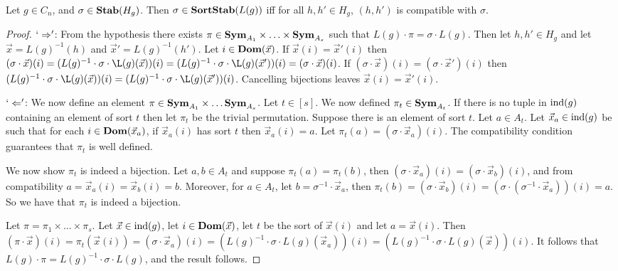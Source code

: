 \documentclass[../paper.tex]{subfiles}
\begin{document}
\begin{lem}
  Let $g \in C_n$, and $\sigma \in \text{\textbf{Stab}}(H_g)$. Then $\sigma \in
  \text{\textbf{SortStab}}(L(g))$ iff for all $h, h' \in H_g$, $(h,h')$ is compatible with
  $\sigma$.
  \label{lem:sortstab-compatible}
\end{lem}
\begin{proof}
  $`\Rightarrow'$: From the hypothesis there exists $\pi \in \text{\textbf{Sym}}_{A_1} \times
  \ldots \times \text{\textbf{Sym}}_{A_s}$ such that $L(g) \cdot \pi = \sigma \cdot L(g)$. Then
  let $h, h' \in H_g$ and let $\vec{x} = L(g)^{-1}(h)$ and $\vec{x}' =
  L(g)^{-1}(h')$. Let $i \in \text{\textbf{Dom}} (\vec{x})$. If $\vec{x}(i) = \vec{x}'(i)$ then
  $(\sigma \cdot \vec{x}) (i) = (L(g)^{-1} \cdot \sigma \cdot \L(g)
  (\vec{x}))(i) = (L(g)^{-1} \cdot \sigma \cdot \L(g) (\vec{x}'))(i) = (\sigma
  \cdot \vec{x}) (i)$. If $(\sigma \cdot \vec{x})(i) = (\sigma \cdot
  \vec{x}')(i)$ then $(L(g)^{-1} \cdot \sigma \cdot \L(g) (\vec{x}))(i) =
  (L(g)^{-1} \cdot \sigma \cdot \L(g) (\vec{x}'))(i)$. Cancelling bijections
  leaves $\vec{x}(i) = \vec{x}'(i)$.
  
  $`\Leftarrow'$: We now define an element $\pi \in \text{\textbf{Sym}}_{A_1} \times \ldots
  \text{\textbf{Sym}}_{A_s}$. Let $t \in [s]$. We now defined $\pi_t \in \text{\textbf{Sym}}_{A_t}$. If there
  is no tuple in $\text{\upshape ind} (g)$ containing an element of sort $t$ then let $\pi_t$
  be the trivial permutation. Suppose there is an element of sort $t$. Let $a
  \in A_t$. Let $\vec{x}_a \in \text{\upshape ind}(g)$ be such that for each $i \in \text{\textbf{Dom}}
  (\vec{x}_a)$, if $\vec{x}_a(i)$ has sort $t$ then $\vec{x}_a(i) = a$. Let
  $\pi_t (a) = (\sigma \cdot \vec{x}_a) (i)$. The compatibility condition
  guarantees that $\pi_t$ is well defined.

  We now show $\pi_t$ is indeed a bijection. Let $a, b \in A_t$ and suppose
  $\pi_t (a) = \pi_t(b)$, then $(\sigma \cdot \vec{x}_a)(i) = (\sigma \cdot
  \vec{x}_b)(i)$, and from compatibility $a = \vec{x}_a(i) = \vec{x}_b(i) = b$.
  Moreover, for $a \in A_t$, let $b = \sigma^{-1} \cdot \vec{x}_a$, then $\pi_t
  (b) = (\sigma \cdot \vec{x}_b)(i) = (\sigma \cdot (\sigma^{-1} \cdot
  \vec{x}_a))(i) = a$. So we have that $\pi_t$ is indeed a bijection.

  Let $\pi = \pi_1 \times \ldots \times \pi_s$. Let $\vec{x} \in \text{\upshape ind}(g)$, let
  $i \in \text{\textbf{Dom}} (\vec{x})$, let $t$ be the sort of $\vec{x}(i)$ and let $a =
  \vec{x}(i)$. Then $(\pi \cdot \vec{x})(i) = \pi_t (\vec{x}(i)) = (\sigma \cdot
  \vec{x}_a)(i) = (L(g)^{-1}\cdot \sigma \cdot L(g)(\vec{x}_a))(i) =
  (L(g)^{-1}\cdot \sigma \cdot L(g)(\vec{x}))(i)$. It follows that $L(g) \cdot
  \pi = L(g)^{-1} \cdot \sigma \cdot L(g)$, and the result follows.

\end{proof}
\end{document}
